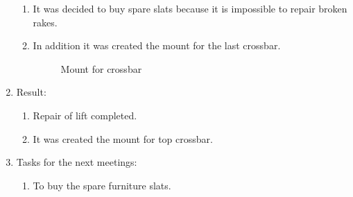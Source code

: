 \begin{enumerate}
\begin{enumerate}
      \item It was decided to buy spare slats because it is impossible to repair broken rakes.
      
      \item In addition it was created the mount for the last crossbar.
      
      \begin{figure}[H]
      	\begin{minipage}[h]{1\linewidth}
      		\caption{Mount for crossbar}
      	\end{minipage}
      \end{figure}
      
    \end{enumerate}
    
	\item Result: 
	\begin{enumerate}
	  \item Repair of lift completed.
	  
      \item It was created the mount for top crossbar.
      
    \end{enumerate}
    
	\item Tasks for the next meetings:
	\begin{enumerate}
	  \item To buy the spare furniture slats.
	  
    \end{enumerate}     
\end{enumerate}
\fillpage